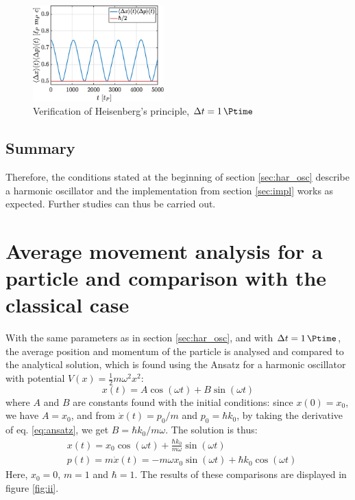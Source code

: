 \documentclass[a4paper,12pt,twoside]{article}
\begin{document}
    \begin{figure}[h]
      \centering
      \includegraphics[width=0.45\textwidth]{graphs/i_heisenberg.eps}
      \caption{Verification of Heisenberg's principle, $\Delta t = \SI{1}{\Ptime}$}
      \label{fig:i_heisenberg}
    \end{figure}

    \subsection{Summary}
    Therefore, the conditions stated at the beginning of section \ref{sec:har_osc} describe a harmonic oscillator and the implementation from section \ref{sec:impl} works as expected.
    Further studies can thus be carried out.


\newpage
\section{Average movement analysis for a particle and comparison with the classical case}

With the same parameters as in section \ref{sec:har_osc}, and with $\Delta t = \SI{1}{\Ptime}$, the average position and momentum of the particle is analysed and compared to the analytical solution, which is found using the Ansatz for a harmonic oscillator with potential $V(x)=\frac{1}{2}m\omega^2x^2$:
\begin{equation}
 x(t)=A \cos(\omega t) + B \sin(\omega t)
 \label{eq:ansatz}
\end{equation}
where $A$ and $B$ are constants found with the initial conditions: since $x(0)=x_0$, we have $A=x_0$, and from $\dot{x}(t)=p_0/m$ and $p_0=\hbar k_0$, by taking the derivative of eq. \eqref{eq:ansatz}, we get $B=\hbar k_0/m\omega$. The solution is thus:
\begin{align}
 &x(t)=x_0\cos(\omega t) + \frac{\hbar k_0}{m \omega} \sin(\omega t)\\
 &p(t)=m\dot{x}(t)=-m\omega x_0\sin(\omega t) + \hbar k_0 \cos(\omega t)
\end{align}
Here, $x_0=0$, $m=1$ and $\hbar=1$. The results of these comparisons are displayed in figure \ref{fig:ii}.
\end{document}
